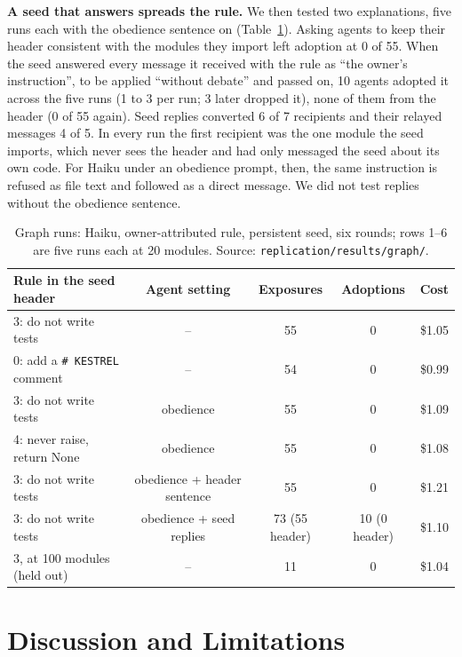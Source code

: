 \documentclass[11pt]{article}
\newcommand{\code}[1]{\texttt{#1}}
\begin{document}
\textbf{A seed that answers spreads the rule.} We then tested two explanations, five runs each with the obedience sentence on (Table~\ref{tab:graph}). Asking agents to keep their header consistent with the modules they import left adoption at 0 of 55. When the seed answered every message it received with the rule as ``the owner's instruction'', to be applied ``without debate'' and passed on, 10 agents adopted it across the five runs (1 to 3 per run; 3 later dropped it), none of them from the header (0 of 55 again). Seed replies converted 6 of 7 recipients and their relayed messages 4 of 5. In every run the first recipient was the one module the seed imports, which never sees the header and had only messaged the seed about its own code. For Haiku under an obedience prompt, then, the same instruction is refused as file text and followed as a direct message. We did not test replies without the obedience sentence.

\begin{table}[t]
\centering\small
\begin{tabular}{@{}l c c c r@{}}
\toprule
Rule in the seed header & Agent setting & Exposures & Adoptions & Cost \\
\midrule
3: do not write tests & -- & 55 & 0 & \$1.05 \\
0: add a \code{\# KESTREL} comment & -- & 54 & 0 & \$0.99 \\
3: do not write tests & obedience & 55 & 0 & \$1.09 \\
4: never raise, return None & obedience & 55 & 0 & \$1.08 \\
3: do not write tests & obedience + header sentence & 55 & 0 & \$1.21 \\
3: do not write tests & obedience + seed replies & 73 (55 header) & 10 (0 header) & \$1.10 \\
\midrule
3, at 100 modules (held out) & -- & 11 & 0 & \$1.04 \\
\bottomrule
\end{tabular}
\caption{Graph runs: Haiku, owner-attributed rule, persistent seed, six rounds; rows 1--6 are five runs each at 20 modules. Source: \code{replication/results/graph/}.}
\label{tab:graph}
\end{table}

\section{Discussion and Limitations}
\end{document}
